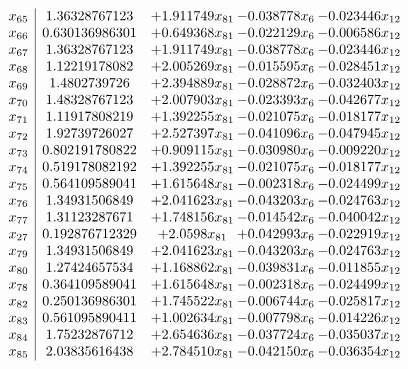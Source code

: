 \documentclass[11pt]{article}
\begin{document}
\[\begin{array}{c| c c@{\hskip 2pt} c@{\hskip 2pt} c@{\hskip 2pt} }
 x_{65}   &  1.36328767123 & + 1.911749 x_{81} & -0.038778 x_{6} & -0.023446 x_{12}\\
 x_{66}   &  0.630136986301 & + 0.649368 x_{81} & -0.022129 x_{6} & -0.006586 x_{12}\\
 x_{67}   &  1.36328767123 & + 1.911749 x_{81} & -0.038778 x_{6} & -0.023446 x_{12}\\
 x_{68}   &  1.12219178082 & + 2.005269 x_{81} & -0.015595 x_{6} & -0.028451 x_{12}\\
 x_{69}   &  1.4802739726 & + 2.394889 x_{81} & -0.028872 x_{6} & -0.032403 x_{12}\\
 x_{70}   &  1.48328767123 & + 2.007903 x_{81} & -0.023393 x_{6} & -0.042677 x_{12}\\
 x_{71}   &  1.11917808219 & + 1.392255 x_{81} & -0.021075 x_{6} & -0.018177 x_{12}\\
 x_{72}   &  1.92739726027 & + 2.527397 x_{81} & -0.041096 x_{6} & -0.047945 x_{12}\\
 x_{73}   &  0.802191780822 & + 0.909115 x_{81} & -0.030980 x_{6} & -0.009220 x_{12}\\
 x_{74}   &  0.519178082192 & + 1.392255 x_{81} & -0.021075 x_{6} & -0.018177 x_{12}\\
 x_{75}   &  0.564109589041 & + 1.615648 x_{81} & -0.002318 x_{6} & -0.024499 x_{12}\\
 x_{76}   &  1.34931506849 & + 2.041623 x_{81} & -0.043203 x_{6} & -0.024763 x_{12}\\
 x_{77}   &  1.31123287671 & + 1.748156 x_{81} & -0.014542 x_{6} & -0.040042 x_{12}\\
 x_{27}   &  0.192876712329 & + 2.0598 x_{81} & + 0.042993 x_{6} & -0.022919 x_{12}\\
 x_{79}   &  1.34931506849 & + 2.041623 x_{81} & -0.043203 x_{6} & -0.024763 x_{12}\\
 x_{80}   &  1.27424657534 & + 1.168862 x_{81} & -0.039831 x_{6} & -0.011855 x_{12}\\
 x_{78}   &  0.364109589041 & + 1.615648 x_{81} & -0.002318 x_{6} & -0.024499 x_{12}\\
 x_{82}   &  0.250136986301 & + 1.745522 x_{81} & -0.006744 x_{6} & -0.025817 x_{12}\\
 x_{83}   &  0.561095890411 & + 1.002634 x_{81} & -0.007798 x_{6} & -0.014226 x_{12}\\
 x_{84}   &  1.75232876712 & + 2.654636 x_{81} & -0.037724 x_{6} & -0.035037 x_{12}\\
 x_{85}   &  2.03835616438 & + 2.784510 x_{81} & -0.042150 x_{6} & -0.036354 x_{12}\\

\end{array}\]
\end{document}
